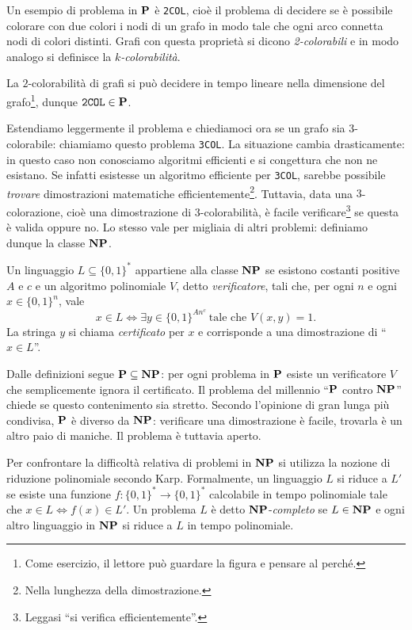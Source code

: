 Un esempio di problema in $\P$ è \texttt{2COL}, cioè il problema di decidere se
è possibile colorare con due colori i nodi di un grafo in modo tale che ogni
arco connetta nodi di colori distinti. Grafi con questa proprietà si dicono
\emph{2-colorabili} e in modo analogo si definisce la \emph{$k$-colorabilità}.

	\begin{figure}[htbp]
		\centering
		
	\end{figure}

La $2$-colorabilità di grafi si può decidere in tempo lineare nella dimensione
del grafo\footnote{Come esercizio, il lettore può guardare la figura e pensare
al perché.}, dunque $\texttt{2COL} \in \P$.

Estendiamo leggermente il problema e chiediamoci ora se un grafo sia
3-colorabile: chiamiamo questo problema \texttt{3COL}.
La situazione cambia drasticamente: in questo caso non conosciamo algoritmi
efficienti e si congettura che non ne esistano. Se infatti esistesse un
algoritmo efficiente per \texttt{3COL}, sarebbe possibile \emph{trovare}
dimostrazioni matematiche efficientemente\footnote{Nella lunghezza
della dimostrazione.}.
Tuttavia, data una $3$-colorazione, cioè una dimostrazione di
3-colorabilità, è facile verificare\footnote{Leggasi
``si verifica efficientemente''.} se questa è valida oppure no.
Lo stesso vale per migliaia di altri problemi: definiamo dunque la classe $\NP$.

\begin{definition}[Classe $\NP$]
	Un linguaggio $L \subseteq \{0,1\}^*$ appartiene alla classe $\NP$ se
	esistono costanti positive $A$ e $c$ e un algoritmo polinomiale $V$,
	detto \emph{verificatore}, tali che, per ogni $n$ e ogni $x \in \{0,1\}^n$,
	vale
	\[
		x \in L \iff \exists y \in \{0,1\}^{A n^c} \ \text{tale che } V(x, y) = 1.
	\]
La stringa $y$ si chiama \emph{certificato} per $x$ e corrisponde a una
dimostrazione di ``$x \in L$''.
\end{definition}

Dalle definizioni segue $\P \subseteq \NP$: per ogni problema in $\P$ esiste
un verificatore $V$ che semplicemente ignora il certificato.
Il problema del millennio ``$\P$ contro $\NP$'' \cite{Cook06} chiede se questo
contenimento sia stretto.
Secondo l'opinione di gran lunga più condivisa, $\P$ è diverso da $\NP$:
verificare una dimostrazione è facile, trovarla è un altro paio di maniche.
Il problema è tuttavia aperto.

Per confrontare la difficoltà relativa di problemi in $\NP$ si utilizza la
nozione di riduzione polinomiale secondo Karp.
Formalmente, un linguaggio $L$ si riduce a $L'$ se esiste
una funzione $f\colon \{0, 1\}^* \to \{0, 1\}^*$ calcolabile in tempo polinomiale tale
che $x \in L \iff f(x) \in L'$. Un problema $L$ è detto $\NP$-\emph{completo}
se $L \in \NP$ e ogni altro linguaggio in $\NP$ si riduce a $L$ in tempo
polinomiale.

